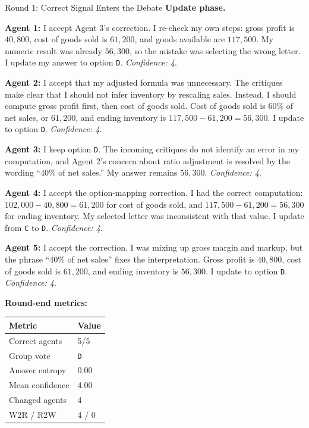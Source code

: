 \begin{roundbox}{Round 1: Correct Signal Enters the Debate}
\textbf{Update phase.}

\textbf{Agent 1:} I accept Agent 3's correction. I re-check my own steps: gross profit is $40{,}800$, cost of goods sold is $61{,}200$, and goods available are $117{,}500$. My numeric result was already $56{,}300$, so the mistake was selecting the wrong letter. I update my answer to option \texttt{D}. \textit{Confidence: 4}.

\textbf{Agent 2:} I accept that my adjusted formula was unnecessary. The critiques make clear that I should not infer inventory by rescaling sales. Instead, I should compute gross profit first, then cost of goods sold. Cost of goods sold is $60\%$ of net sales, or $61{,}200$, and ending inventory is $117{,}500-61{,}200=56{,}300$. I update to option \texttt{D}. \textit{Confidence: 4}.

\textbf{Agent 3:} I keep option \texttt{D}. The incoming critiques do not identify an error in my computation, and Agent 2's concern about ratio adjustment is resolved by the wording ``40\% of net sales.'' My answer remains $56{,}300$. \textit{Confidence: 4}.

\textbf{Agent 4:} I accept the option-mapping correction. I had the correct computation: $102{,}000-40{,}800=61{,}200$ for cost of goods sold, and $117{,}500-61{,}200=56{,}300$ for ending inventory. My selected letter was inconsistent with that value. I update from \texttt{C} to \texttt{D}. \textit{Confidence: 4}.

\textbf{Agent 5:} I accept the correction. I was mixing up gross margin and markup, but the phrase ``40\% of net sales'' fixes the interpretation. Gross profit is $40{,}800$, cost of goods sold is $61{,}200$, and ending inventory is $56{,}300$. I update to option \texttt{D}. \textit{Confidence: 4}.

\vspace{1mm}
\textbf{Round-end metrics:}
\begin{center}
\footnotesize
\begin{tabular}{@{}ll@{}}
\toprule
Metric & Value \\
\midrule
Correct agents & 5/5 \\
Group vote & \texttt{D} \\
Answer entropy & 0.00 \\
Mean confidence & 4.00 \\
Changed agents & 4 \\
W2R / R2W & 4 / 0 \\
\bottomrule
\end{tabular}
\end{center}


\end{roundbox}
